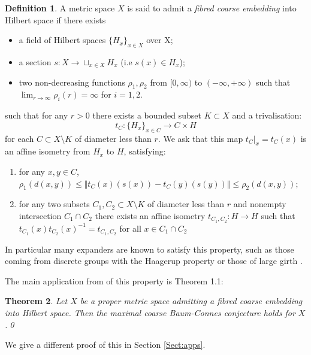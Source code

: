 \documentclass[11pt]{amsart}
\theoremstyle{plain}
\newtheorem{theorem}{Theorem}%
\theoremstyle{definition}%
\newtheorem{definition}[theorem]{Definition}%
\theoremstyle{remark}%
\begin{document}
\begin{definition}
A metric space $X$ is said to admit a \textit{fibred coarse embedding} into Hilbert space if there exists
\begin{itemize}
\item a field of Hilbert spaces $\lbrace H_{x} \rbrace_{x \in X}$ over X;
\item a section $s: X \rightarrow \sqcup_{x \in X}H_{x}$ (i.e $s(x) \in H_{x}$);
\item two non-decreasing functions $\rho_{1}, \rho_{2}$ from $[0,\infty)$ to $(-\infty, +\infty)$ such that $\lim_{r\rightarrow \infty}\rho_{i}(r)=\infty$ for $i=1,2$.
\end{itemize}
such that for any $r>0$ there exists a bounded subset $K\subset X$ and a trivalisation:
\begin{equation*}
t_{C}: \lbrace H_{x} \rbrace_{x \in C} \rightarrow C\times H
\end{equation*}
for each $C \subset X \setminus K$ of diameter less than $r$. We ask that this map $t_{C}|_{x}=t_{C}(x)$ is an affine isometry from  $H_{x}$ to $H$, satisfying:
\begin{enumerate}
\item for any $x,y \in C$, $\rho_{1}(d(x,y))\leq \Vert t_{C}(x)(s(x)) - t_{C}(y)(s(y)) \Vert \leq \rho_{2}(d(x,y))$;
\item for any two subsets $C_{1},C_{2} \subset X\setminus K$ of diameter less than $r$ and nonempty intersection $C_{1}\cap C_{2}$ there exists an affine isometry $t_{C_{1},C_{2}}:H \rightarrow H$ such that $t_{C_{1}}(x)t_{C_{2}}(x)^{-1}=t_{C_{1},C_{2}}$ for all $x \in C_{1}\cap C_{2}$
\end{enumerate}
\end{definition}

In particular many expanders are known to satisfy this property, such as those coming from discrete groups with the Haagerup property  or those of large girth \cite{FCEpaper,MR2568691}.

The main application from \cite{FCEpaper} of this property is Theorem 1.1:

\begin{theorem}\label{Thm:FCEMR}
Let $X$ be a proper metric space admitting a fibred coarse embedding into Hilbert space. Then the maximal coarse Baum-Connes conjecture holds for $X$.\qed
\end{theorem}

We give a different proof of this in Section \ref{Sect:apps}.
\end{document}
